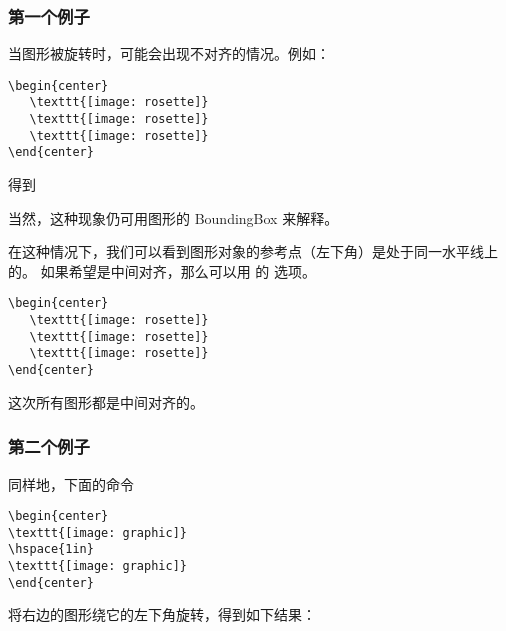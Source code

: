 \subsubsection{第一个例子}

当图形被旋转时，可能会出现不对齐的情况。例如：

\begin{lstlisting}
\begin{center}
   \texttt{[image: rosette]}
   \texttt{[image: rosette]}
   \texttt{[image: rosette]}
\end{center}
\end{lstlisting}
得到

\begin{center}
	\resizebox*{!}{1in}{\usebox{\boxrosette}}
\end{center}
当然，这种现象仍可用图形的 BoundingBox 来解释。

\begin{center}
	\resizebox*{!}{1in}{\usebox{\boxrosettebox}}
\end{center}
在这种情况下，我们可以看到图形对象的参考点（左下角）是处于同一水平线上的。
如果希望是中间对齐，那么可以用  的  选项。
\begin{lstlisting}
\begin{center}
   \texttt{[image: rosette]}
   \texttt{[image: rosette]}
   \texttt{[image: rosette]}
\end{center}
\end{lstlisting}
这次所有图形都是中间对齐的。

\begin{center}
	\resizebox*{!}{1in}{\usebox{\boxrosette}}
\end{center}

\subsubsection{第二个例子}
同样地，下面的命令
\begin{lstlisting}
\begin{center}
\texttt{[image: graphic]}
\hspace{1in}
\texttt{[image: graphic]}
\end{center}
\end{lstlisting}
将右边的图形绕它的左下角旋转，得到如下结果：
\begin{center}
	\resizebox{1in}{!}{\usebox{\boxgraphic}}
	\hspace{1in}
\end{center}

